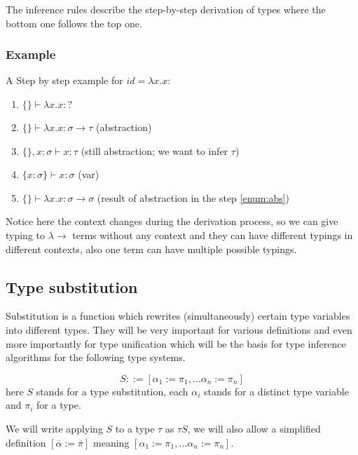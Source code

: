 The inference rules describe the step-by-step derivation of types where the bottom one follows the top one.

\subsubsection{Example}
A Step by step example for $id = \lambda x . x$:

\begin{enumerate}
    \item $\{\} \vdash \lambda x . x : ?$
    \item $\{\} \vdash \lambda x . x : \sigma \rightarrow \tau$ (abstraction) \label{enum:abs}
    \item $\{\}, x : \sigma \vdash x : \tau$ (still abstraction; we want to infer $\tau$)
    \item $\{x : \sigma\} \vdash x : \sigma$ (var)
    \item $\{\} \vdash \lambda x . x : \sigma \rightarrow \sigma$ (result of abstraction in the step \ref{enum:abs})
\end{enumerate}

Notice here the context changes during the derivation process, so we can give typing to $\lambda\rightarrow$ terms without any context and they can have different typings in different contexts, also one term can have multiple possible typings.


\subsection{Type substitution}

Substitution is a function which rewrites (simultaneously) certain type variables into different types. They will be very important for various definitions and even more importantly for type unification which will be the basis for type inference algorithms for the following type systems.

\begin{defn}
    \label{defn:substitution}
    $$S ::= [\alpha_1 := \pi_1, \dots \alpha_n := \pi_n]$$
    here $S$ stands for a type substitution, each $\alpha_i$ stands for a distinct type variable and $\pi_i$ for a type.
\end{defn}

We will write applying $S$ to a type $\tau$ as $\tau S$, we will also allow a simplified definition $[\overline{\alpha} := \overline{\pi}]$ meaning $[\alpha_1 := \pi_1, \dots \alpha_n := \pi_n]$.

